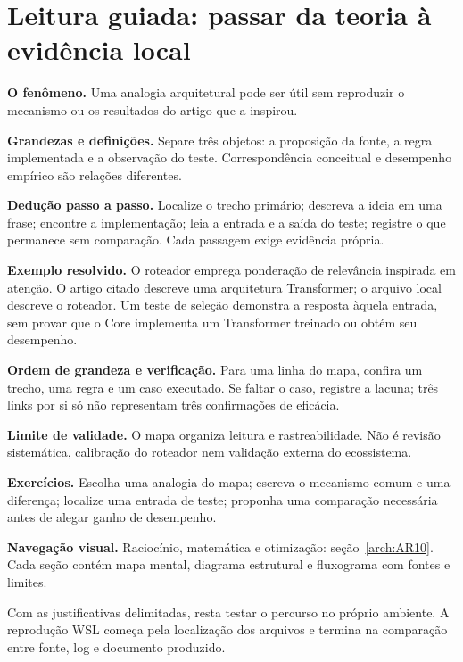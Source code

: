 \section[Leitura guiada]{Leitura guiada: passar da teoria à evidência local}
\begin{descricao}
\textbf{O fenômeno.} Uma analogia arquitetural pode ser útil sem reproduzir o mecanismo ou os resultados do artigo que a inspirou.
\end{descricao}
\begin{definicao}
\textbf{Grandezas e definições.} Separe três objetos: a proposição da fonte, a regra implementada e a observação do teste. Correspondência conceitual e desempenho empírico são relações diferentes.
\end{definicao}
\begin{metodo}
\textbf{Dedução passo a passo.} Localize o trecho primário; descreva a ideia em uma frase; encontre a implementação; leia a entrada e a saída do teste; registre o que permanece sem comparação. Cada passagem exige evidência própria.
\end{metodo}
\begin{resultado}
\textbf{Exemplo resolvido.} O roteador emprega ponderação de relevância inspirada em atenção. O artigo citado descreve uma arquitetura Transformer; o arquivo local descreve o roteador. Um teste de seleção demonstra a resposta àquela entrada, sem provar que o Core implementa um Transformer treinado ou obtém seu desempenho.
\end{resultado}
\begin{resultado}
\textbf{Ordem de grandeza e verificação.} Para uma linha do mapa, confira um trecho, uma regra e um caso executado. Se faltar o caso, registre a lacuna; três links por si só não representam três confirmações de eficácia.
\end{resultado}
\begin{aviso}
\textbf{Limite de validade.} O mapa organiza leitura e rastreabilidade. Não é revisão sistemática, calibração do roteador nem validação externa do ecossistema.
\end{aviso}
\begin{resultado}
\textbf{Exercícios.} Escolha uma analogia do mapa; escreva o mecanismo comum e uma diferença; localize uma entrada de teste; proponha uma comparação necessária antes de alegar ganho de desempenho.
\end{resultado}



\begin{descricao}\textbf{Navegação visual.} Raciocínio, matemática e otimização: seção~\ref{arch:AR10}. Cada seção contém mapa mental, diagrama estrutural e fluxograma com fontes e limites.\end{descricao}


Com as justificativas delimitadas, resta testar o percurso no próprio ambiente. A reprodução WSL começa pela localização dos arquivos e termina na comparação entre fonte, log e documento produzido.
